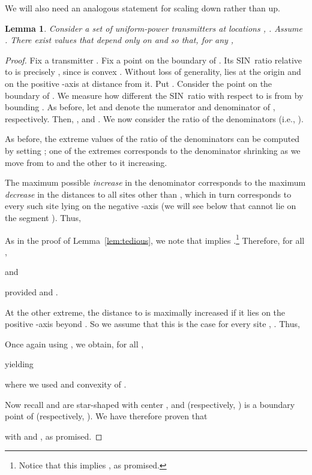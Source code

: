 \documentclass[11pt]{article}
\newtheorem{lemma}[theorem]{Lemma}
\theoremstyle{remark}
\begin{document}
We will also need an analogous statement for scaling  down rather than up.
\begin{lemma}
  \label{lem:tedious2}
  Consider a set of  uniform-power transmitters at locations , . 
  Assume . There exist values  that depend only on  and  so that, for any , 
  
\end{lemma}
\begin{proof}
  Fix a transmitter .  Fix a point  on the boundary of .  Its SIN~ratio  relative to 
  is precisely , since  is convex
  \cite{aeklpr-sdciawn-12}.  Without loss of generality,  lies at
  the origin and  on the positive -axis at distance  from it.
  Put .  Consider the point  on the boundary
  of .  We measure how different the SIN~ratio  with respect to  is
  from  by bounding . 
  As before, let  and  denote the numerator and denominator of , respectively.
  Then, , and
  .
  We now consider the ratio of the denominators (i.e., ).
  
 As before, the extreme values of the ratio of the denominators can be computed by setting ; one of the extremes corresponds to the denominator shrinking as we move from  to  and the other to it increasing.

The maximum possible \emph{increase} in the denominator
corresponds to the maximum \emph{decrease} in the distances to all sites other than ,
which in turn corresponds to every such site  lying on the negative -axis (we will see below that  cannot lie on the segment ).  
Thus,
  
  As in the proof of Lemma~\ref{lem:tedious}, we note that 
   implies .\footnote{Notice that this implies , as promised.}
  Therefore, for all ,
  
  and
  
  provided  and .


  At the other extreme, the distance to  is maximally increased if it lies on the positive -axis beyond .
So we assume that this is the case for every site , . Thus, 
  
 Once again using , we obtain, for all ,
  
  yielding
  
  where we used  and convexity of . 


  Now recall  and  are star-shaped with center , and  (respectively, ) is a boundary point of  (respectively, ).  We have therefore proven that 
  
  with  and , as promised.
\end{proof}
\end{document}
